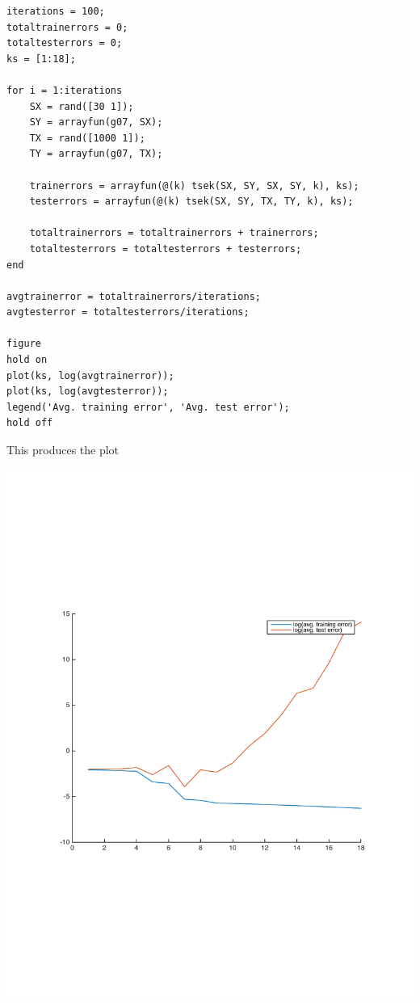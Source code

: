 \documentclass[11pt]{article}
\begin{document}
\begin{itemize}
        \begin{lstlisting}
iterations = 100;
totaltrainerrors = 0;
totaltesterrors = 0;
ks = [1:18];

for i = 1:iterations
    SX = rand([30 1]);
    SY = arrayfun(g07, SX);
    TX = rand([1000 1]);
    TY = arrayfun(g07, TX);
    
    trainerrors = arrayfun(@(k) tsek(SX, SY, SX, SY, k), ks);
    testerrors = arrayfun(@(k) tsek(SX, SY, TX, TY, k), ks);
    
    totaltrainerrors = totaltrainerrors + trainerrors;
    totaltesterrors = totaltesterrors + testerrors;
end

avgtrainerror = totaltrainerrors/iterations;
avgtesterror = totaltesterrors/iterations;

figure
hold on
plot(ks, log(avgtrainerror));
plot(ks, log(avgtesterror));
legend('Avg. training error', 'Avg. test error');
hold off\end{lstlisting}

        This produces the plot
        \begin{center}
        \includegraphics[width=\linewidth]{2e}
        \end{center}

\end{itemize}
\end{document}
